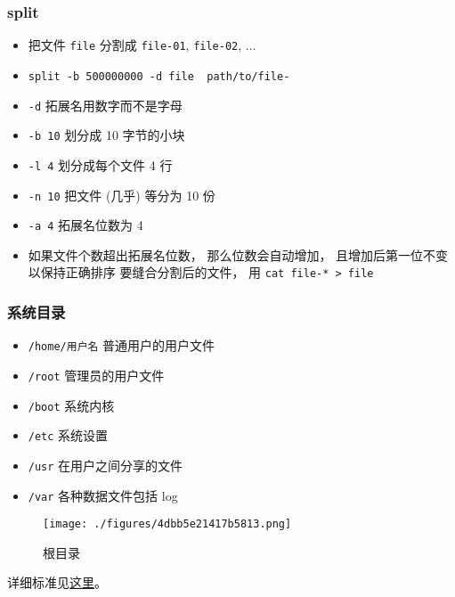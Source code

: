 \subsubsection{split}
\begin{itemize}
\item 把文件 \verb`file` 分割成 \verb`file-01`, \verb`file-02`, ...
\item \verb`split -b 500000000 -d file  path/to/file-`
\item \verb`-d` 拓展名用数字而不是字母
\item \verb`-b 10` 划分成 10 字节的小块
\item \verb`-l 4` 划分成每个文件 4 行
\item \verb`-n 10` 把文件 (几乎) 等分为 10 份
\item \verb`-a 4` 拓展名位数为 4
\item 如果文件个数超出拓展名位数， 那么位数会自动增加， 且增加后第一位不变以保持正确排序
要缝合分割后的文件， 用 \verb`cat file-* > file`
\end{itemize}

\subsubsection{系统目录}
\begin{itemize}
\item \verb`/home/用户名` 普通用户的用户文件
\item \verb`/root` 管理员的用户文件
\item \verb`/boot` 系统内核
\item \verb`/etc` 系统设置
\item \verb`/usr` 在用户之间分享的文件
\item \verb`/var` 各种数据文件包括 log
\end{itemize}
\begin{figure}[ht]
\centering
\texttt{[image: ./figures/4dbb5e21417b5813.png]}
\caption{根目录} \label{fig_LinNt_2}
\end{figure}
详细标准见\href{https://www.pathname.com/fhs/}{这里}。

